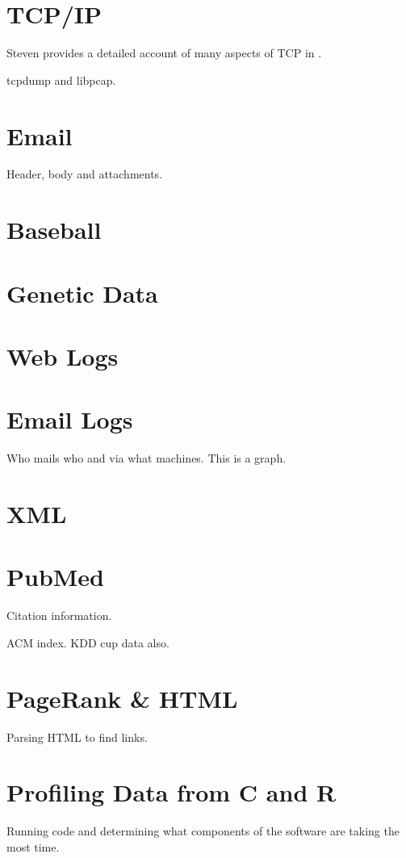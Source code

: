 \section{TCP/IP}
\begin{bibunit}
Steven provides a detailed account
of many aspects of TCP in \cite{TCPIllustrated3}.

tcpdump and libpcap.

\end{bibunit}

\section{Email}
Header, body  and attachments.

\section{Baseball}

\section{Genetic Data}

\section{Web Logs}


\section{Email Logs}
Who mails who and via what machines.
This is a graph.


\section{XML}

\section{PubMed}
Citation information.

ACM index.
KDD cup data also.

\section{PageRank \& HTML}
Parsing HTML to find links.


\section{Profiling Data from C and R}
Running code and determining what 
components of the software are taking the most time.


